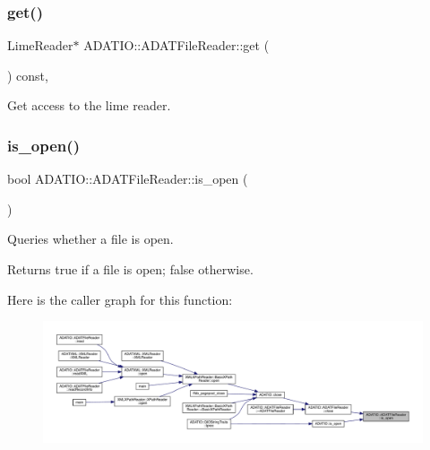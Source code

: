 \subsubsection{\texorpdfstring{get()}{get()}}
{\footnotesize\ttfamily Lime\+Reader$\ast$ A\+D\+A\+T\+I\+O\+::\+A\+D\+A\+T\+File\+Reader\+::get (\begin{DoxyParamCaption}{ }\end{DoxyParamCaption}) const\hspace{0.3cm}{\ttfamily [inline]}, {\ttfamily [protected]}}



Get access to the lime reader. 

\mbox{\label{group__qio_ga601972c66a6e6671d7b41ee1bce80e82}} 
\subsubsection{\texorpdfstring{is\_open()}{is\_open()}\hspace{0.1cm}{\footnotesize\ttfamily [1/2]}}
{\footnotesize\ttfamily bool A\+D\+A\+T\+I\+O\+::\+A\+D\+A\+T\+File\+Reader\+::is\+\_\+open (\begin{DoxyParamCaption}{ }\end{DoxyParamCaption})}



Queries whether a file is open. 

\begin{DoxyReturn}{Returns}
true if a file is open; false otherwise. 
\end{DoxyReturn}
Here is the caller graph for this function\+:
\nopagebreak
\begin{figure}[H]
\begin{center}
\leavevmode
\includegraphics[width=350pt]{db/de5/group__qio_ga601972c66a6e6671d7b41ee1bce80e82_icgraph}
\end{center}
\end{figure}
\mbox{\label{group__qio_gad9b8cab72f011dd46c24a51e8a1c756a}} 
